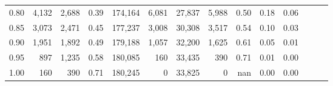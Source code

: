 \begin{tabular}{rrrrrrrrrrrrrr}
0.80 &   4,132 &  2,688 &  0.39 &  174,164 &    6,081 &  27,837 &   5,988 &  0.50 &  0.18 &      0.06 \\
0.85 &   3,073 &  2,471 &  0.45 &  177,237 &    3,008 &  30,308 &   3,517 &  0.54 &  0.10 &      0.03 \\
0.90 &   1,951 &  1,892 &  0.49 &  179,188 &    1,057 &  32,200 &   1,625 &  0.61 &  0.05 &      0.01 \\
0.95 &     897 &  1,235 &  0.58 &  180,085 &      160 &  33,435 &     390 &  0.71 &  0.01 &      0.00 \\
1.00 &     160 &    390 &  0.71 &  180,245 &        0 &  33,825 &       0 &   nan &  0.00 &      0.00 \\
\bottomrule
\end{tabular}
